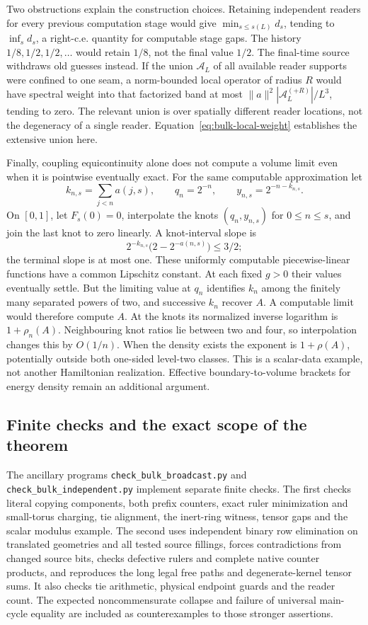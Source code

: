 Two obstructions explain the construction choices. Retaining
independent readers for every previous computation stage would give
$\min_{s\leq s(L)}d_s$, tending to $\inf_s d_s$, a right-c.e.
quantity for computable stage gaps. The history
$1/8,1/2,1/2,\ldots$ would retain $1/8$, not the final value $1/2$.
The final-time source withdraws old guesses instead. If the union
$\mathcal A_L$ of all available reader supports were confined to
one seam, a norm-bounded local operator of radius $R$ would have
spectral weight into that factorized band at most
$\|a\|^2|\mathcal A_L^{(+R)}|/L^3$, tending to zero. The relevant
union is over spatially different reader locations, not the
degeneracy of a single reader. Equation~\eqref{eq:bulk-local-weight}
establishes the extensive union here.

Finally, coupling equicontinuity alone does not compute a volume
limit even when it is pointwise eventually exact. For the same
computable approximation let
\[
 k_{n,s}=\sum_{j<n}a(j,s),\qquad
 q_n=2^{-n},\qquad y_{n,s}=2^{-n-k_{n,s}}.
\]
On $[0,1]$, let $F_s(0)=0$, interpolate the knots
$(q_n,y_{n,s})$ for $0\leq n\leq s$, and join the last knot to
zero linearly. A knot-interval slope is
\[
 2^{-k_{n,s}}\bigl(2-2^{-a(n,s)}\bigr)\leq3/2;
\]
the terminal slope is at most one. These uniformly computable
piecewise-linear functions have a common Lipschitz constant.
At each fixed $g>0$ their values eventually settle. But the limiting
value at $q_n$ identifies $k_n$ among the finitely many separated
powers of two, and successive $k_n$ recover $A$. A computable limit
would therefore compute $A$. At the knots its normalized inverse
logarithm is $1+\rho_n(A)$. Neighbouring knot ratios lie between
two and four, so interpolation changes this by $O(1/n)$. When
the density exists the exponent is $1+\rho(A)$, potentially outside
both one-sided level-two classes. This is a scalar-data example,
not another Hamiltonian realization. Effective boundary-to-volume
brackets for energy density remain an additional argument.

\subsection{Finite checks and the exact scope of the theorem}
The ancillary programs \texttt{check\_bulk\_broadcast.py} and
\texttt{check\_bulk\_independent.py} implement separate finite checks.
The first checks literal copying components, both prefix counters,
exact ruler minimization and small-torus charging, tie alignment,
the inert-ring witness, tensor gaps and the scalar modulus example.
The second uses independent binary row elimination on translated
geometries and all tested source fillings, forces contradictions
from changed source bits, checks defective rulers and complete
native counter products, and reproduces the long legal free paths
and degenerate-kernel tensor sums. It also checks tie arithmetic,
physical endpoint guards and the reader count. The expected
noncommensurate collapse and failure of universal main-cycle
equality are included as counterexamples to those stronger assertions.

